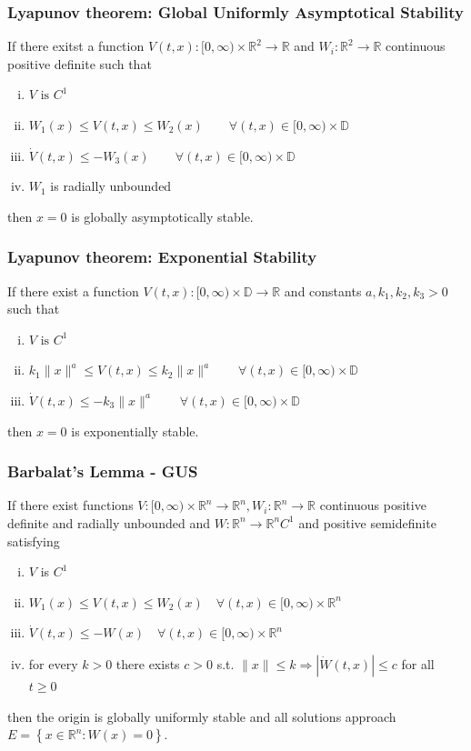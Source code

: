 \documentclass{article}
\newcommand{\mathbbR}{\mathbb{R}}
\begin{document}
\subsubsection{Lyapunov theorem: Global Uniformly Asymptotical Stability}
If there exitst a function $V(t,x):[0, \infty) \times \mathbb{R}^2 \rightarrow
	\mathbbR$ and $W_i: \mathbb{R}^2 \rightarrow \mathbb{R}$ continuous positive
definite such that
\begin{enumerate}[i)]
	\item $V \text{ is } C^1$
	\item $W_1(x) \leq V(t,x) \leq W_2(x) \qquad \forall (t,x) \in [0, \infty) \times \mathbb{D}$
	\item $\dot V(t,x) \leq -W_3(x) \qquad \forall (t,x) \in [0, \infty) \times \mathbb{D}$
	\item $W_1$ is radially unbounded
\end{enumerate}
then $x=0$ is globally asymptotically stable.
\subsubsection{Lyapunov theorem: Exponential Stability}
If there exist a function $V(t,x):[0, \infty) \times \mathbb{D} \rightarrow
	\mathbbR$ and constants $a, k_1, k_2, k_3 > 0$ such that
\begin{enumerate}[i)]
	\item $V \text{ is } C^1$
	\item $k_1 \|x\|^a \leq V(t,x) \leq k_2 \|x\|^a \qquad \forall (t,x) \in [0, \infty) \times \mathbb{D}$
	\item $\dot V(t,x) \leq -k_3 \|x\|^a \qquad \forall (t,x) \in [0, \infty) \times \mathbb{D}$
\end{enumerate}
then $x=0$ is exponentially stable.
\subsubsection{Barbalat's Lemma - GUS}
If there exist functions $V:[0, \infty) \times \mathbb{R}^n \rightarrow
	\mathbb{R}^n, W_i: \mathbb{R}^n \rightarrow \mathbb{R}$ continuous positive
definite and radially unbounded and $W: \mathbb{R}^n \rightarrow \mathbb{R}^n
	C^1$ and positive semidefinite satisfying
\begin{enumerate}[i)]
	\item $V$ is $C^1$
	\item $W_1(x) \leq V(t, x) \leq W_2(x) \quad \forall(t, x) \in[0, \infty) \times \mathbb{R}^n$
	\item $\dot{V}(t, x) \leq-W(x) \quad \forall(t, x) \in[0, \infty) \times \mathbb{R}^n$
	\item for every $k>0$ there exists $c>0$ s.t. $\|x\| \leq k
		      \Longrightarrow|\dot{W}(t, x)| \leq c$ for all $t \geq 0$
\end{enumerate}
then the origin is globally uniformly stable and all solutions approach $E=\left\{x \in \mathbb{R}^n: W(x)=0\right\}$.
\end{document}
